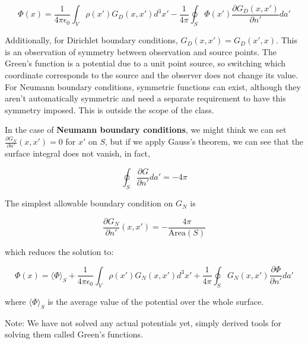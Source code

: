 \documentclass[a4paper,twoside,master.tex]{subfiles}
\begin{document}
\begin{equation}
    \Phi(x) = \frac{1}{4\pi\epsilon_0}\int_V\rho(x')G_D(x,x')d^3x' - \frac{1}{4\pi}\oint_S\Phi(x')\frac{\partial G_D(x,x')}{\partial n'}da'
\end{equation}

Additionally, for Dirichlet boundary conditions, $G_D(x,x') = G_D(x',x)$. This is an observation of symmetry between observation and source points. The Green's function is a potential due to a unit point source, so switching which coordinate corresponds to the source and the observer does not change its value. For Neumann boundary conditions, symmetric functions can exist, although they aren't automatically symmetric and need a separate requirement to have this symmetry imposed. This is outside the scope of the class.

In the case of \textbf{Neumann boundary conditions}, we might think we can set $\frac{\partial G_N}{\partial n'}(x,x') = 0$ for $x'$ on $S$, but if we apply Gauss's theorem, we can see that the surface integral does not vanish, in fact,

\begin{equation}
    \oint_S\frac{\partial G}{\partial n'}da' = -4\pi
\end{equation}

The simplest allowable boundary condition on $G_N$ is

\begin{equation}
    \frac{\partial G_N}{\partial n'}(x,x') = -\frac{4\pi}{\text{Area}(S)}
\end{equation}

which reduces the solution to:

\begin{equation}
    \Phi(x) = \langle\Phi\rangle_S + \frac{1}{4\pi\epsilon_0}\int_V\rho(x')G_N(x,x')d^3x' + \frac{1}{4\pi}\oint_S G_N(x,x')\frac{\partial\Phi}{\partial n'}da'
\end{equation}

where $\langle\Phi\rangle_S$ is the average value of the potential over the whole surface.

\begin{note}{Note:}
We have not solved any actual potentials yet, simply derived tools for solving them called Green's functions.
\end{note}
\end{document}
